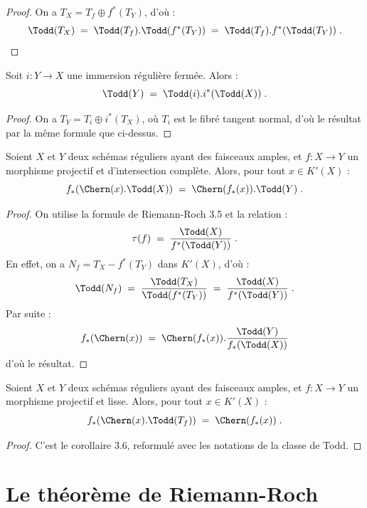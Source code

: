 \begin{proof}
On a $T_X = T_f \oplus f^*(T_Y)$, d'où :
\[
\Todd(T_X) \; = \; \Todd(T_f) . \Todd(f^*(T_Y)) \; = \; \Todd(T_f) . f^*(\Todd(T_Y))\; .
\]
\end{proof}

\begin{proposition}[4.3]%
Soit $i : Y \to X$ une immersion régulière fermée. Alors :
\[
\Todd(Y) \; = \; \Todd(i) . i^*(\Todd(X))\; .
\]
\end{proposition}

\begin{proof}
On a $T_Y = T_i \oplus i^*(T_X)$, où $T_i$ est le fibré tangent normal, d'où le résultat par la même formule que ci-dessus.
\end{proof}


\begin{theoreme}[4.4]%
Soient $X$ et $Y$ deux schémas réguliers ayant des faisceaux amples, et $f : X \to Y$ un morphisme projectif et d'intersection complète. Alors, pour tout $x \in K'(X)$ :
\[
f_*(\Chern(x) . \Todd(X)) \; = \; \Chern(f_*(x)) . \Todd(Y)\; .
\]
\end{theoreme}

\begin{proof}
On utilise la formule de Riemann-Roch 3.5 et la relation :
\[
\tau(f) \; = \; \frac{\Todd(X)}{f^*(\Todd(Y))}\; .
\]
En effet, on a $N_f = T_X - f^*(T_Y)$ dans $K'(X)$, d'où :
\[
\Todd(N_f) \; = \; \frac{\Todd(T_X)}{\Todd(f^*(T_Y))} \; = \; \frac{\Todd(X)}{f^*(\Todd(Y))}\; .
\]
Par suite :
\[
f_*(\Chern(x)) \; = \; \Chern(f_*(x)) . \frac{\Todd(Y)}{f_*(\Todd(X))}
\]
d'où le résultat.
\end{proof}

\begin{corollaire}[4.5]%
Soient $X$ et $Y$ deux schémas réguliers ayant des faisceaux amples, et $f : X \to Y$ un morphisme projectif et lisse. Alors, pour tout $x \in K'(X)$ :
\[
f_*(\Chern(x) . \Todd(T_f)) \; = \; \Chern(f_*(x))\; .
\]
\end{corollaire}

\begin{proof}
C'est le corollaire 3.6, reformulé avec les notations de la classe de Todd.
\end{proof}


\section{Le théorème de Riemann-Roch}

